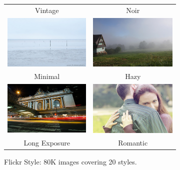 \begin{figure}[t]
{\begin{subfigure}[t]{0.48\linewidth}
\begin{tabular}{cc}
    Vintage & Noir \\
        \includegraphics[width=.43\linewidth]{../style/figures/flickrDatasetExamples/used/resized/minimal.jpg} &
    \includegraphics[width=.43\linewidth]{../style/figures/flickrDatasetExamples/used/resized/hazy.jpg} \\
    Minimal & Hazy \\
        \includegraphics[width=.43\linewidth]{../style/figures/flickrDatasetExamples/used/resized/long_exposure.jpg} &
    \includegraphics[width=.43\linewidth]{../style/figures/flickrDatasetExamples/used/resized/romantic.jpg} \\
    Long Exposure & Romantic \\
    \end{tabular}
    \caption{
        Flickr Style: 80K images covering 20 styles.
    }\label{fig:flickr_style_examples}
\end{subfigure}\hspace{2em}\begin{subfigure}[t]{0.48\linewidth}
    \begin{tabular}{cc}

\end{tabular}
\end{subfigure}}
\end{figure}
